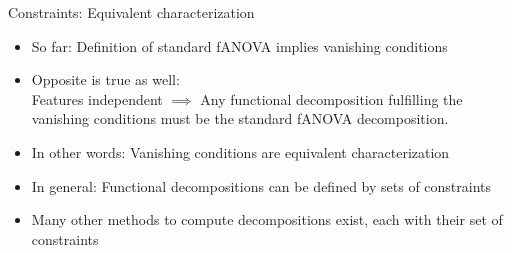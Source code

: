 \documentclass[11pt,compress,t,notes=noshow, aspectratio=169, xcolor=table]{beamer}
\begin{document}
\begin{frame}{Constraints: Equivalent characterization}

    \begin{itemize}[<+->]
    
        \item So far: Definition of standard fANOVA implies vanishing conditions
        \item Opposite is true as well: \\
        Features independent $\implies$ Any functional decomposition fulfilling the vanishing conditions must be the standard fANOVA decomposition.
        \item In other words: Vanishing conditions are equivalent characterization
        \item In general: Functional decompositions can be defined by sets of constraints \\
        \item Many other methods to compute decompositions exist, each with their set of constraints
    
    \end{itemize}

    
\end{frame}


    
    
    
    
    

     



\endlecture
\end{document}
